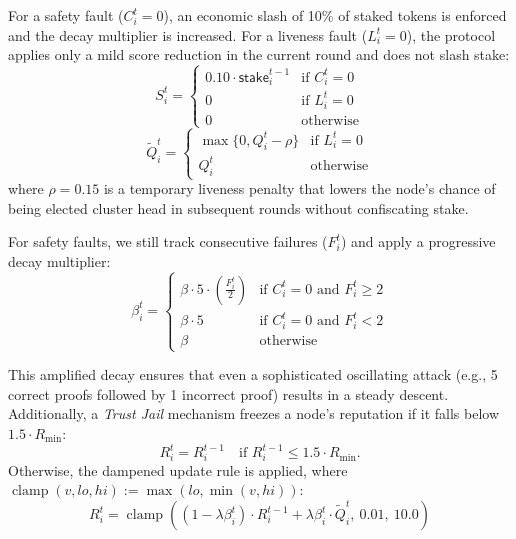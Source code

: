 \documentclass[journal]{IEEEtran}
\begin{document}
For a safety fault ($C_i^t = 0$), an economic slash of 10\% of staked tokens is enforced and the decay multiplier is increased. For a liveness fault ($L_i^t = 0$), the protocol applies only a mild score reduction in the current round and does not slash stake:
\begin{equation}
S_i^t = \begin{cases}
0.10 \cdot \mathsf{stake}_i^{t-1} & \text{if } C_i^t = 0 \\
0 & \text{if } L_i^t = 0 \\
0 & \text{otherwise}
\end{cases}
\label{eq:stake_penalty}
\end{equation}
\begin{equation}
\widetilde{Q}_i^t = \begin{cases}
\max\{0, Q_i^t - \rho\} & \text{if } L_i^t = 0 \\
Q_i^t & \text{otherwise}
\end{cases}
\label{eq:liveness_penalty}
\end{equation}
where $\rho = 0.15$ is a temporary liveness penalty that lowers the node's chance of being elected cluster head in subsequent rounds without confiscating stake.

For safety faults, we still track consecutive failures ($F_i^t$) and apply a progressive decay multiplier:
\begin{equation}
\beta_i^t = \begin{cases}
\beta \cdot 5 \cdot \left(\frac{F_i^t}{2}\right) & \text{if } C_i^t = 0 \text{ and } F_i^t \geq 2 \\
\beta \cdot 5 & \text{if } C_i^t = 0 \text{ and } F_i^t < 2 \\
\beta & \text{otherwise}
\end{cases}
\label{eq:progressive_beta}
\end{equation}

This amplified decay ensures that even a sophisticated oscillating attack (e.g., 5 correct proofs followed by 1 incorrect proof) results in a steady descent. Additionally, a \textit{Trust Jail} mechanism freezes a node's reputation if it falls below $1.5 \cdot R_{\min}$:
\begin{equation}
R_i^t = R_i^{t-1} \quad \text{if } R_i^{t-1} \leq 1.5 \cdot R_{\min}.
\end{equation}
Otherwise, the dampened update rule is applied, where $\operatorname{clamp}(v, lo, hi) := \max(lo, \min(v, hi))$:
\begin{equation}
R_i^t = \operatorname{clamp}\left((1 - \lambda \beta_i^t) \cdot R_i^{t-1} + \lambda \beta_i^t \cdot \widetilde{Q}_i^t, \ 0.01, \ 10.0\right)
\label{eq:reputation_update}
\end{equation}
\end{document}
